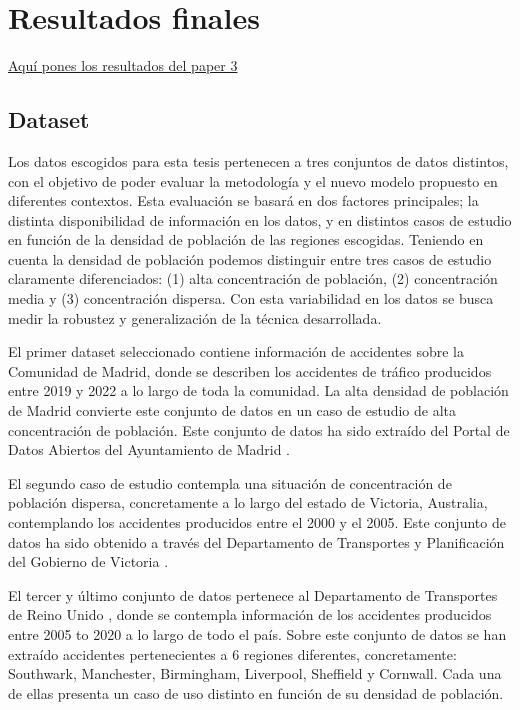 \documentclass{uathesis-es}
\begin{document}
\section{Resultados finales}

\underline{Aquí pones los resultados del paper 3}


\subsection{Dataset}

Los datos escogidos para esta tesis pertenecen a tres conjuntos de datos distintos, con el objetivo de poder evaluar la metodología y el nuevo modelo propuesto en diferentes contextos. Esta evaluación se basará en dos factores principales; la distinta disponibilidad de información en los datos, y en distintos casos de estudio en función de la densidad de población de las regiones escogidas. Teniendo en cuenta la densidad de población podemos distinguir entre tres casos de estudio claramente diferenciados: (1) alta concentración de población, (2) concentración media y (3) concentración dispersa. Con esta variabilidad en los datos se busca medir la robustez y generalización de la técnica desarrollada.

El primer dataset seleccionado contiene información de accidentes sobre la Comunidad de Madrid, donde se describen los accidentes de tráfico producidos entre 2019 y 2022 a lo largo de toda la comunidad. La alta densidad de población de Madrid convierte este conjunto de datos en un caso de estudio de alta concentración de población. Este conjunto de datos ha sido extraído del Portal de Datos Abiertos del Ayuntamiento de Madrid \cite{InfoDatasetMadrid}. 

El segundo caso de estudio contempla una situación de concentración de población dispersa, concretamente a lo largo del estado de Victoria, Australia, contemplando los accidentes producidos entre el 2000 y el 2005. Este conjunto de datos ha sido obtenido a través del Departamento de Transportes y Planificación del Gobierno de Victoria \cite{InfoDatasetVictoria}.

El tercer y último conjunto de datos pertenece al Departamento de Transportes de Reino Unido \cite{DatasetUK}, donde se contempla información de los accidentes producidos entre 2005 to 2020 a lo largo de todo el país. Sobre este conjunto de datos se han extraído accidentes pertenecientes a 6 regiones diferentes, concretamente: Southwark, Manchester, Birmingham, Liverpool, Sheffield y Cornwall. Cada una de ellas presenta un caso de uso distinto en función de su densidad de población. 
\end{document}
